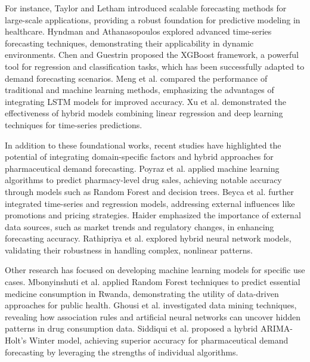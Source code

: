 \documentclass[journal]{IEEEtran}
\begin{document}
For instance, Taylor and Letham \cite{taylor2018forecasting} introduced scalable forecasting methods for large-scale applications, providing a robust foundation for predictive modeling in healthcare. Hyndman and Athanasopoulos \cite{hyndman2018forecasting} explored advanced time-series forecasting techniques, demonstrating their applicability in dynamic environments. Chen and Guestrin \cite{chen2016xgboost} proposed the XGBoost framework, a powerful tool for regression and classification tasks, which has been successfully adapted to demand forecasting scenarios. Meng et al. \cite{meng2021comparative} compared the performance of traditional and machine learning methods, emphasizing the advantages of integrating LSTM models for improved accuracy. Xu et al. \cite{xu2019hybrid} demonstrated the effectiveness of hybrid models combining linear regression and deep learning techniques for time-series predictions.

In addition to these foundational works, recent studies have highlighted the potential of integrating domain-specific factors and hybrid approaches for pharmaceutical demand forecasting. Poyraz et al. \cite{poyraz2020drug} applied machine learning algorithms to predict pharmacy-level drug sales, achieving notable accuracy through models such as Random Forest and decision trees. Beyca et al. \cite{beyca2022integration} further integrated time-series and regression models, addressing external influences like promotions and pricing strategies. Haider \cite{haider2022enhancing} emphasized the importance of external data sources, such as market trends and regulatory changes, in enhancing forecasting accuracy. Rathipriya et al. \cite{rathipriya2023time} explored hybrid neural network models, validating their robustness in handling complex, nonlinear patterns.

Other research has focused on developing machine learning models for specific use cases. Mbonyinshuti et al. \cite{mbonyinshuti2022essential} applied Random Forest techniques to predict essential medicine consumption in Rwanda, demonstrating the utility of data-driven approaches for public health. Ghousi et al. \cite{ghousi2012data} investigated data mining techniques, revealing how association rules and artificial neural networks can uncover hidden patterns in drug consumption data. Siddiqui et al. \cite{siddiqui2021hybrid} proposed a hybrid ARIMA-Holt’s Winter model, achieving superior accuracy for pharmaceutical demand forecasting by leveraging the strengths of individual algorithms.
\end{document}
